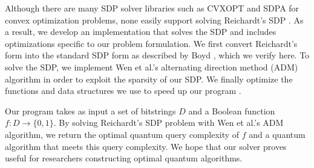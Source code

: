 Although there are many SDP solver libraries such as CVXOPT and
SDPA for convex optimization problems,
none easily support solving Reichardt's SDP
\cite{cvxopt, SDPA}.
As a result, we develop an implementation that solves the SDP
and includes optimizations specific to our problem formulation.
We first convert Reichardt's form into the standard SDP form
as described by Boyd \cite{boyd2004convex}, which we verify here.
To solve the SDP, we implement Wen et al.'s alternating direction method (ADM)
algorithm in order to exploit the sparsity of our SDP.
We finally optimize the functions and data structures we use
to speed up our program \cite{adm}. 

Our program takes as input a set of bitstrings $D$
and a Boolean function $f: D \rightarrow \{0,1\}$. 
By solving Reichardt's SDP problem with
Wen et al.'s ADM algorithm,
we return the optimal quantum query complexity of $f$
and a quantum algorithm that meets this query complexity.
We hope that our solver proves useful
for researchers constructing optimal quantum algorithms.
